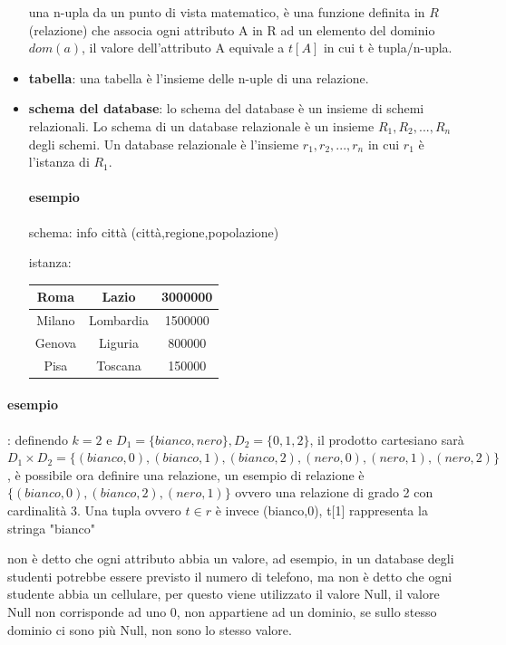 \documentclass{article}
\begin{document}
\begin{itemize}
            una n-upla da un punto di vista matematico, è una funzione definita in $R$(relazione) che associa ogni attributo A in R ad un elemento del dominio $dom(a)$, il valore dell'attributo A equivale a $t[A]$ in cui t è tupla/n-upla.

        \item \textbf{tabella}:
            una tabella è l'insieme delle n-uple di una relazione.
        \item \textbf{schema del database}:
            lo schema del database è un insieme di schemi relazionali. Lo schema di un database relazionale è un insieme $R_1,R_2,...,R_n$ degli schemi. Un database relazionale è l'insieme $r_1,r_2,...,r_n$ in cui $r_1$ è l'istanza di $R_1$.
            
            \paragraph{esempio}
                schema: info città (città,regione,popolazione)
                
                istanza:
                \begin{tabular}{|c|c|c|}
                    \hline
                    Roma & Lazio & 3000000\\
                    \hline
                    Milano &Lombardia & 1500000\\
                    \hline
                    Genova & Liguria& 800000\\
                    \hline
                    Pisa & Toscana & 150000\\
                    \hline
                \end{tabular}
        
        
    \end{itemize}

    \paragraph{esempio}:
        definendo $k=2$ e $D_1=\{bianco,nero\},D_2=\{0,1,2\}$, il prodotto cartesiano sarà $D_1\times D_2=\{(bianco,0),(bianco,1),(bianco,2),(nero,0),(nero,1),(nero,2)\}$, è possibile ora definire una relazione, un esempio di relazione è $\{(bianco,0),(bianco,2),(nero,1)\}$ ovvero una relazione di grado 2 con cardinalità 3.
        Una tupla ovvero $t\in r$ è invece (bianco,0), t[1] rappresenta la stringa "bianco"

    \begin{tcolorbox}[colback= green!10!white, colframe= green!40!black, title=Nota bene]

        non è detto che ogni attributo abbia un valore, ad esempio, in un database degli studenti potrebbe essere previsto il numero di telefono, ma non è detto che ogni studente abbia un cellulare, per questo viene utilizzato il valore Null, il valore Null non corrisponde ad uno 0, non appartiene ad un dominio, se sullo stesso dominio ci sono più Null, non sono lo stesso valore.
    \end{tcolorbox}
\end{document}
